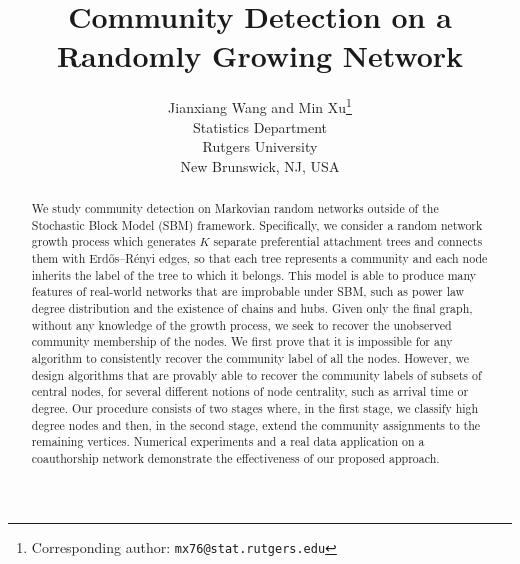 \documentclass[twoside,11pt]{article}
\title{Community Detection on a Randomly Growing Network}
\author{\name Jianxiang Wang and Min Xu\thanks{Corresponding author: \texttt{mx76@stat.rutgers.edu}} \\
\addr 
Statistics Department \\
Rutgers University \\
New Brunswick, NJ, USA}
\date{}
\theoremstyle{remark}
\begin{document}
\raggedbottom
\maketitle

   \begin{abstract}%
We study community detection on Markovian random networks outside of the Stochastic Block Model (SBM) framework. Specifically, we consider a random network growth process which generates $K$ separate preferential attachment trees and connects them with Erd\H{o}s--R\'enyi edges, so that each tree represents a community and each node inherits the label of the tree to which it belongs. This model is able to produce many features of real-world networks that are improbable under SBM, such as power law degree distribution and the existence of chains and hubs. Given only the final graph, without any knowledge of the growth process, we seek to recover the unobserved community membership of the nodes. We first prove that it is impossible for any algorithm to consistently recover the community label of all the nodes. However, we design algorithms that are provably able to recover the community labels of subsets of central nodes, for several different notions of node centrality, such as arrival time or degree. Our procedure consists of two stages where, in the first stage, we classify high degree nodes and then, in the second stage, extend the community assignments to the remaining vertices. Numerical experiments and a real data application on a coauthorship network demonstrate the effectiveness of our proposed approach.




\end{abstract} 
\end{document}
